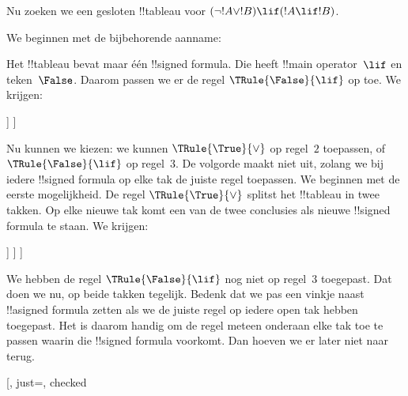 \documentclass[openany]{memoir}
\begin{document}
\begin{ex}
Nu zoeken we een gesloten !!{tableau} voor
$(\lnot !A \lor !B) \lif (!A \lif !B)$.

We beginnen met de bijbehorende aanname:
\begin{oltableau}
  [\sFmla{\False}{(\lnot \formula{A} \lor \formula{B}) \lif
      (\formula{A} \lif \formula{B})}, just=\TAss]
\end{oltableau}
Het !!{tableau} bevat maar één !!{signed formula}. Die heeft
!!{main operator}~$\lif$ en teken~$\False$. Daarom passen we er de regel
$\TRule{\False}{\lif}$ op toe. We krijgen:
\begin{oltableau}
  [\sFmla{\False}{(\lnot \formula{A} \lor \formula{B})
      \lif (\formula{A} \lif \formula{B})}, just=\TAss, checked
    [\sFmla{\True}{\lnot \formula{A} \lor \formula{B}},
      just={\TRule{\False}{\lif}[1]}
      [\sFmla{\False}{(\formula{A} \lif \formula{B})},
        just={\TRule{\False}{\lif}[1]}
      ]
    ]
  ]
\end{oltableau}
Nu kunnen we kiezen: we kunnen $\TRule{\True}{\lor}$ op regel~$2$
toepassen, of $\TRule{\False}{\lif}$ op regel~$3$. De volgorde maakt
niet uit, zolang we bij iedere !!{signed formula} op elke tak de juiste
regel toepassen. We beginnen met de eerste mogelijkheid. De regel
$\TRule{\True}{\lor}$ splitst het !!{tableau} in twee takken. Op elke
nieuwe tak komt een van de twee conclusies als nieuwe !!{signed formula}
te staan. We krijgen:
\begin{oltableau}
  [\sFmla{\False}{(\lnot \formula{A} \lor \formula{B}) \lif
      (\formula{A} \lif \formula{B})}, just=\TAss, checked
    [\sFmla{\True}{\lnot \formula{A} \lor \formula{B}},
      just={\TRule{\False}{\lif}[1]}, checked
      [\sFmla{\False}{(\formula{A} \lif \formula{B})},
        just={\TRule{\False}{\lif}[1]}
        [\sFmla{\True}{\lnot \formula{A}}, just={\TRule{\True}{\lor}[2]}]
        [\sFmla{\True}{\formula{B}}, just={\TRule{\True}{\lor}[2]}]
      ]
    ]
  ]
\end{oltableau}
We hebben de regel $\TRule{\False}{\lif}$ nog niet op regel~$3$
toegepast. Dat doen we nu, op beide takken tegelijk. Bedenk dat we pas
een vinkje naast !!a{signed formula} zetten als we de juiste regel op
iedere open tak hebben toegepast. Het is daarom handig om de regel
meteen onderaan elke tak toe te passen waarin die !!{signed formula}
voorkomt. Dan hoeven we er later niet naar terug.
\begin{oltableau}
  [, just=\TAss, checked

\end{oltableau}
\end{ex}
\end{document}
